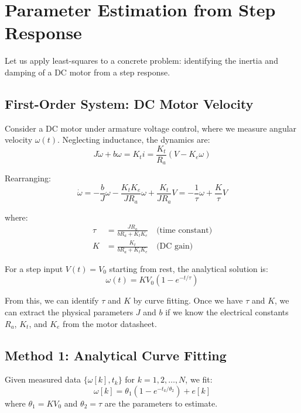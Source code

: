 \section{Parameter Estimation from Step Response}

Let us apply least-squares to a concrete problem: identifying the inertia and damping of a DC motor from a step response.

\subsection{First-Order System: DC Motor Velocity}

Consider a DC motor under armature voltage control, where we measure angular velocity $\omega(t)$. Neglecting inductance, the dynamics are:
\begin{equation}
J\dot{\omega} + b\omega = K_t i = \frac{K_t}{R_a}(V - K_e\omega)
\end{equation}

Rearranging:
\begin{equation}
\dot{\omega} = -\frac{b}{J}\omega - \frac{K_tK_e}{JR_a}\omega + \frac{K_t}{JR_a}V = -\frac{1}{\tau}\omega + \frac{K}{\tau}V
\end{equation}

where:
\begin{align}
\tau &= \frac{JR_a}{bR_a + K_tK_e} \quad \text{(time constant)} \\
K &= \frac{K_t}{bR_a + K_tK_e} \quad \text{(DC gain)}
\end{align}

For a step input $V(t) = V_0$ starting from rest, the analytical solution is:
\begin{equation}
\omega(t) = KV_0(1 - e^{-t/\tau})
\end{equation}

From this, we can identify $\tau$ and $K$ by curve fitting. Once we have $\tau$ and $K$, we can extract the physical parameters $J$ and $b$ if we know the electrical constants $R_a$, $K_t$, and $K_e$ from the motor datasheet.

\subsection{Method 1: Analytical Curve Fitting}

Given measured data $\{\omega[k], t_k\}$ for $k = 1, 2, \ldots, N$, we fit:
\begin{equation}
\omega[k] = \theta_1(1 - e^{-t_k/\theta_2}) + e[k]
\end{equation}
where $\theta_1 = KV_0$ and $\theta_2 = \tau$ are the parameters to estimate.

